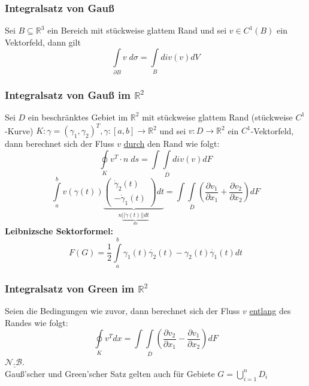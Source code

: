 \documentclass[a4paper,twocolumn,10pt]{article}
\begin{document}
\subsubsection{Integralsatz von Gauß}
Sei $B\subseteq\mathbb{R}^3$ ein Bereich mit stückweise glattem Rand und sei $v\in C^1(B)$ ein Vektorfeld, dann gilt
\begin{equation*}
\int\limits_{\partial B}v\;d\sigma =\int\limits_{B}div(v)dV
\end{equation*}

\subsubsection{Integralsatz von Gauß im $\mathbb{R}^2$}
Sei $D$ ein beschränktes Gebiet im $\mathbb{R}^2$ mit stückweise glattem Rand (stückweise $C^1$-Kurve) $K:\gamma=(\gamma_1,\gamma_2)^T, \gamma:[a,b]\rightarrow\mathbb{R}^2$ und sei $v:D\rightarrow\mathbb{R}^2$ ein $C^1$-Vektorfeld, dann berechnet sich der Fluss $v$ \underline{durch} den Rand wie folgt:
\begin{equation*}
\oint\limits_{K}v^T\cdot n\;ds=\int\int\limits_{\overline{D}}div(v)dF
\end{equation*}
\begin{equation*}
\int\limits_{a}^{b}v(\gamma(t))\underbrace{\begin{pmatrix}\dot{\gamma}_2(t) \\ -\dot{\gamma}_1(t)\end{pmatrix}dt}_{n\underbrace{||\dot{\gamma}(t)||dt}_{ds}}=\int\int\limits_{\overline{D}}\left(\frac{\partial v_1}{\partial x_1}+\frac{\partial v_2}{\partial x_2}\right)dF
\end{equation*}
\textbf{Leibnizsche Sektorformel:}
\begin{equation*}
F(G)=\frac{1}{2}\int\limits_{a}^{b}\gamma_1(t)\dot{\gamma_2}(t)-\gamma_2(t)\dot{\gamma_1}(t)dt
\end{equation*}

\subsubsection{Integralsatz von Green im $\mathbb{R}^2$}
Seien die Bedingungen wie zuvor, dann berechnet sich der Fluss $v$ \underline{entlang} des Randes wie folgt:
\begin{equation*}
\oint\limits_{K}v^Tdx=\int\int\limits_{\overline{D}}\left(\frac{\partial v_2}{\partial x_1}-\frac{\partial v_1}{\partial x_2}\right)dF
\end{equation*}
$\underline{\mathcal{N.B.}}$\\
Gauß'scher und Green'scher Satz gelten auch für Gebiete $G=\bigcup\limits_{i=1}^{n}D_i$
\end{document}
